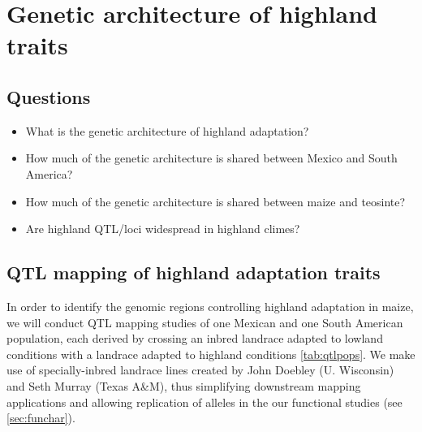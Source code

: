 \section{Genetic architecture of highland traits}

\subsection*{Questions}
\begin{itemize}
\item What is the genetic architecture of highland adaptation?
\item How much of the genetic architecture is shared between Mexico and South America?
\item How much of the genetic architecture is shared between maize and teosinte?
\item Are highland QTL/loci widespread in highland climes?
\end{itemize}

\subsection{QTL mapping of highland adaptation traits}

In order to identify the genomic regions controlling highland adaptation in maize, we will conduct QTL mapping studies of one Mexican and one South American population, each derived by crossing an inbred landrace adapted to lowland conditions with a landrace adapted to highland conditions \ref{tab:qtlpops}.  We make use of specially-inbred landrace lines created by John Doebley (U. Wisconsin) and Seth Murray (Texas A\&M), thus simplifying downstream mapping applications and allowing replication of alleles in the our functional studies (see \ref{sec:funchar}). 

